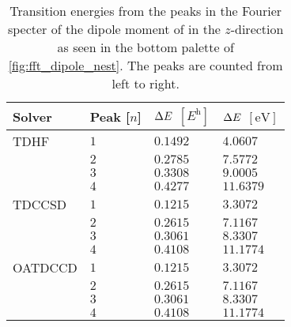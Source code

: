         \begin{table}
            \centering
            \caption{Transition energies from the peaks in the Fourier specter
            of the dipole moment of  in the $z$-direction as seen in the
            bottom palette of \autoref{fig:fft_dipole_nest}.
            The peaks are counted from left to right.}
            \renewcommand{\arraystretch}{1.3}
            \begin{tabular}{@{}llll@{}}
                \toprule
                Solver & Peak [$n$] & $\Delta E$ $[\si{\hartree}]$
                & $\Delta E$ $[\si{\electronvolt}]$ \\
                \midrule
                TDHF & $1$ & $0.1492$ & $4.0607$ \\
                & $2$ & $0.2785$ & $7.5772$ \\
                & $3$ & $0.3308$ & $9.0005$ \\
                & $4$ & $0.4277$ & $11.6379$ \\
                TDCCSD & $1$ & $0.1215$ & $3.3072$ \\
                & $2$ & $0.2615$ & $7.1167$ \\
                & $3$ & $0.3061$ & $8.3307$ \\
                & $4$ & $0.4108$ & $11.1774$ \\
                OATDCCD & $1$ & $0.1215$ & $3.3072$ \\
                & $2$ & $0.2615$ & $7.1167$ \\
                & $3$ & $0.3061$ & $8.3307$ \\
                & $4$ & $0.4108$ & $11.1774$ \\
                \bottomrule
            \end{tabular}
            \label{tab:fft_dipole_nest_z}
        \end{table}

